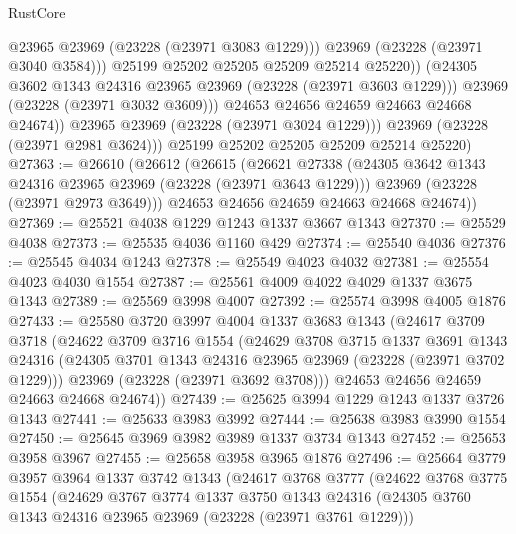 \begin{lexlean}{RustCore}
\begin{coremodule}
                        @23965
                        @23969
                        (@23228 (@23971 @3083 @1229)))
                      @23969
                      (@23228 (@23971 @3040 @3584)))
                    @25199
                    @25202
                    @25205
                    @25209
                    @25214
                    @25220))
                (@24305 @3602 @1343 @24316 @23965 @23969 (@23228 (@23971 @3603 @1229)))
                @23969
                (@23228 (@23971 @3032 @3609)))
              @24653
              @24656
              @24659
              @24663
              @24668
              @24674))
          @23965
          @23969
          (@23228 (@23971 @3024 @1229)))
        @23969
        (@23228 (@23971 @2981 @3624)))
      @25199
      @25202
      @25205
      @25209
      @25214
      @25220)
@27363 := @26610
    (@26612
      (@26615
        (@26621
          @27338
          (@24305 @3642 @1343 @24316 @23965 @23969 (@23228 (@23971 @3643 @1229)))
          @23969
          (@23228 (@23971 @2973 @3649)))
        @24653
        @24656
        @24659
        @24663
        @24668
        @24674))
@27369 := @25521 @4038 @1229 @1243 @1337 @3667 @1343
@27370 := @25529 @4038
@27373 := @25535 @4036 @1160 @429
@27374 := @25540 @4036
@27376 := @25545 @4034 @1243
@27378 := @25549 @4023 @4032
@27381 := @25554 @4023 @4030 @1554
@27387 := @25561 @4009 @4022 @4029 @1337 @3675 @1343
@27389 := @25569 @3998 @4007
@27392 := @25574 @3998 @4005 @1876
@27433 := @25580
    @3720
    @3997
    @4004
    @1337
    @3683
    @1343
    (@24617
      @3709
      @3718
      (@24622
        @3709
        @3716
        @1554
        (@24629
          @3708
          @3715
          @1337
          @3691
          @1343
          @24316
          (@24305 @3701 @1343 @24316 @23965 @23969 (@23228 (@23971 @3702 @1229)))
          @23969
          (@23228 (@23971 @3692 @3708)))
        @24653
        @24656
        @24659
        @24663
        @24668
        @24674))
@27439 := @25625 @3994 @1229 @1243 @1337 @3726 @1343
@27441 := @25633 @3983 @3992
@27444 := @25638 @3983 @3990 @1554
@27450 := @25645 @3969 @3982 @3989 @1337 @3734 @1343
@27452 := @25653 @3958 @3967
@27455 := @25658 @3958 @3965 @1876
@27496 := @25664
    @3779
    @3957
    @3964
    @1337
    @3742
    @1343
    (@24617
      @3768
      @3777
      (@24622
        @3768
        @3775
        @1554
        (@24629
          @3767
          @3774
          @1337
          @3750
          @1343
          @24316
          (@24305 @3760 @1343 @24316 @23965 @23969 (@23228 (@23971 @3761 @1229)))

\end{coremodule}
\end{lexlean}
